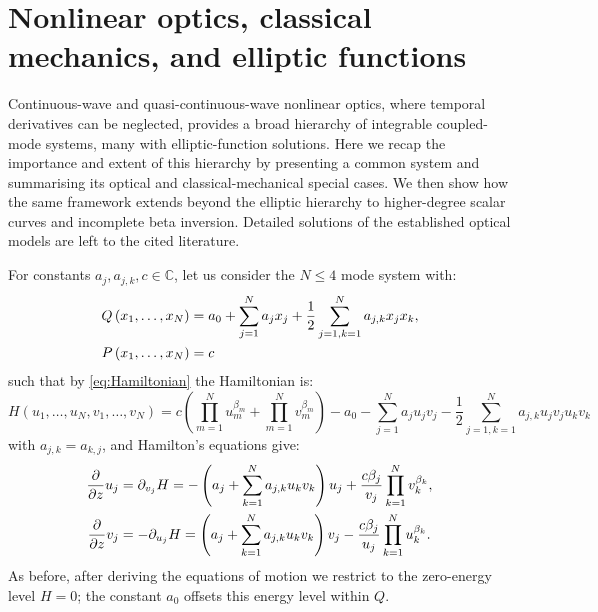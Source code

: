 \documentclass[11pt,a4paper]{article}
\numberwithin{equation}{section}
\begin{document}
\section{Nonlinear optics, classical mechanics, and elliptic functions}
\label{sec:elliptic-examples}

Continuous-wave and quasi-continuous-wave nonlinear optics, where temporal derivatives can be neglected, provides a broad hierarchy of integrable coupled-mode systems, many with elliptic-function solutions. Here we recap the importance and extent of this hierarchy by presenting a common system and summarising its optical and classical-mechanical special cases. We then show how the same framework extends beyond the elliptic hierarchy to higher-degree scalar curves and incomplete beta inversion. Detailed solutions of the established optical models are left to the cited literature.

For constants $a_j, a_{j,k}, c \in \mathbb{C}$, let us consider the $N \le 4$ mode system with:
\begin{align}
\label{eq:Q-elliptic-system}
Q\left(x_1,\dots,x_N\right) &= {a}_{0} + \sum_{j=1}^{N} {a}_{j} {x}_{j} + \frac{1}{2}\sum_{j=1, k=1}^{N} {a}_{j,k} {x}_{j} {x}_{k}, \notag \\
P\left(x_1,\dots,x_N\right) &= c
\end{align}
such that by \eqref{eq:Hamiltonian} the Hamiltonian is:
\begin{equation}
    H\left(u_1,\dots, u_N, v_1,\dots, v_N\right) = c\left(\prod_{m=1}^{N} u_{m}^{{\beta}_{m}} + \prod_{m=1}^{N} v_{m}^{{\beta}_{m}}\right) - {a}_{0} - \sum_{j=1}^{N} {a}_{j} u_j v_j - \frac{1}{2}\sum_{j=1, k=1}^{N} {a}_{j,k} u_j v_j u_k v_k
\end{equation} 
with $a_{j,k}=a_{k,j}$, and Hamilton's equations give:
\begin{align}
\frac{\partial}{\partial z} u_j &= \partial_{v_j}H = -\left({a}_{j} + \sum_{k=1}^{N} {a}_{j,k} u_k v_k \right) u_j + \frac{c {\beta}_{j}}{v_j} \prod_{k=1}^{N} v^{{\beta}_{k}}_k, \notag \\
\frac{\partial}{\partial z} v_j &= -\partial_{u_j}H =\left({a}_{j} + \sum_{k=1}^{N} {a}_{j,k} u_k v_k \right) v_j - \frac{c {\beta}_{j}}{u_j} \prod_{k=1}^{N} u^{{\beta}_{k}}_k. \label{eq:elliptic-system}
\end{align}
As before, after deriving the equations of motion we restrict to the zero-energy level $H=0$; the constant $a_0$ offsets this energy level within $Q$.
\end{document}
